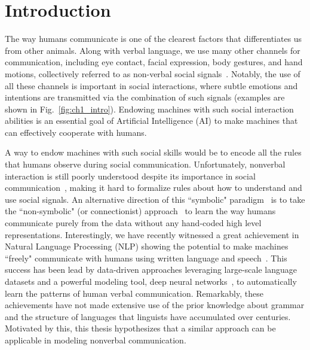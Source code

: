 
%
%	

\chapter{Introduction}
The way humans communicate is one of the clearest factors that differentiates us from other animals. Along with verbal language, we use many other channels for communication, including eye contact, facial expression, body gestures, and hand motions, collectively referred to as non-verbal social signals~\cite{Moore13}. Notably, the use of all these channels is important in social interactions, where subtle emotions and intentions are transmitted via the combination of such signals (examples are shown in Fig.~\ref{fig:ch1_intro}). Endowing machines with such social interaction abilities is an essential goal of Artificial Intelligence (AI) to make machines that can effectively cooperate with humans.%


A way to endow machines with such social skills would be to encode all the rules that humans observe during social communication. Unfortunately, nonverbal interaction is still poorly understood despite its importance in social communication~\cite{Mehrabian67,Mehrabian81,Birdwhistell-1970}, making it hard to formalize rules about how to understand and use social signals. An alternative direction of this ``symbolic" paradigm~\cite{newell1976} is to take the ``non-symbolic" (or connectionist) approach~\cite{rumelhart1986parallel} to learn the way humans communicate purely from the data without any hand-coded high level representations. Interestingly, we have recently witnessed a great achievement in Natural Language Processing (NLP) showing the potential to make machines ``freely" communicate with humans using written language and speech~\cite{young2018recent}. This success has been lead by data-driven approaches leveraging large-scale language datasets and a powerful modeling tool, deep neural networks~\cite{lecun2015deep}, to automatically learn the patterns of human verbal communication. Remarkably, these achievements have not made extensive use of the prior knowledge about grammar and the structure of languages that linguists have accumulated over centuries. Motivated by this, this thesis hypothesizes that a similar approach can be applicable in modeling nonverbal communication. 


